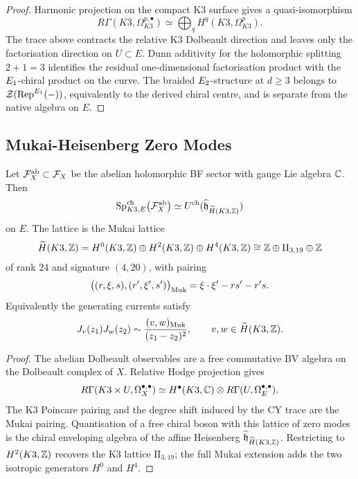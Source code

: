 \begin{proof}
Harmonic projection on the compact K3 surface gives a quasi-isomorphism
\[
 R\Gamma(K3,\Omega_{K3}^{p,\bullet})
 \simeq
 \bigoplus_q H^q(K3,\Omega^p_{K3}).
\]
The trace above contracts the relative K3 Dolbeault direction and leaves
only the factorisation direction on \(U\subset E\). Dunn additivity for
the holomorphic splitting \(2+1=3\) identifies the residual
one-dimensional factorisation product with the \(E_1\)-chiral product
on the curve. The braided \(E_2\)-structure at \(d\geq 3\) belongs to
\(\mathcal Z(\mathrm{Rep}^{E_1}(-))\), equivalently to the derived
chiral centre, and is separate from the native algebra on \(E\).
\end{proof}

\subsection{Mukai-Heisenberg Zero Modes}
\label{spk3e:mukai-heisenberg-zero-modes}

\begin{proposition}
\label{spk3e:prop-abelian-sector}
Let \(\mathcal{F}^{\mathrm{ab}}_X\subset \mathcal{F}_X\) be the abelian holomorphic
BF sector with gauge Lie algebra \(\mathbb{C}\). Then
\[
 \mathrm{Sp}^{\mathrm{ch}}_{K3,E}\!\left(\mathcal{F}^{\mathrm{ab}}_X\right)
 \simeq
 U^{\mathrm{ch}}(\widehat{\mathfrak{h}}_{\widetilde H(K3,\mathbb{Z})})
\]
on \(E\). The lattice is the Mukai lattice
\[
 \widetilde H(K3,\mathbb{Z})=H^0(K3,\mathbb{Z})\oplus H^2(K3,\mathbb{Z})\oplus H^4(K3,\mathbb{Z})
 \cong \mathbb{Z}\oplus \mathrm{II}_{3,19}\oplus \mathbb{Z}
\]
of rank \(24\) and signature \((4,20)\), with pairing
\[
 \bigl((r,\xi,s),(r',\xi',s')\bigr)_{\mathrm{Muk}}
 = \xi\cdot \xi'-rs'-r's.
\]
Equivalently the generating currents satisfy
\[
 J_v(z_1)J_w(z_2)\sim
 \frac{(v,w)_{\mathrm{Muk}}}{(z_1-z_2)^2},
 \qquad v,w\in\widetilde H(K3,\mathbb{Z}).
\]
\end{proposition}

\begin{proof}
The abelian Dolbeault observables are a free commutative BV algebra on
the Dolbeault complex of \(X\). Relative Hodge projection gives
\[
 R\Gamma(K3\times U,\Omega_X^{\bullet,\bullet})
 \simeq
 H^\bullet(K3,\mathbb{C})\otimes R\Gamma(U,\Omega_E^{\bullet,\bullet}).
\]
The K3 Poincare pairing and the degree shift induced by the CY trace are
the Mukai pairing. Quantisation of a free chiral boson with this lattice
of zero modes is the chiral enveloping algebra of the affine Heisenberg
\(\widehat{\mathfrak{h}}_{\widetilde H(K3,\mathbb{Z})}\). Restricting to \(H^2(K3,\mathbb{Z})\)
recovers the K3 lattice \(\mathrm{II}_{3,19}\); the full Mukai extension
adds the two isotropic generators \(H^0\) and \(H^4\).
\end{proof}

